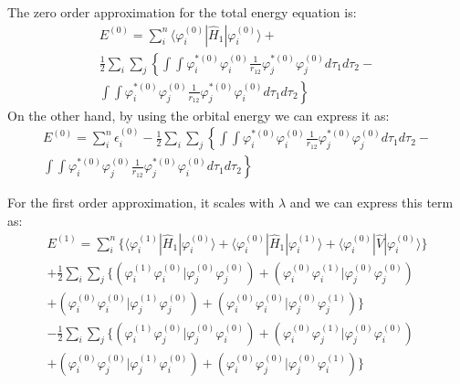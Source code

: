 The zero order approximation for the total energy equation is:
\begin{multline}\label{PTIMQMeq:11}
E^{(0)} =
\sum_{i}^{n}\langle\varphi^{(0)}_{i}|\hat{H}_{1}|\varphi^{(0)}_{i}\rangle
+
\\
\frac{1}{2}\sum_{i}\sum_{j} \left\{
\int\int\varphi^{*(0)}_{i}\varphi^{(0)}_{i}\frac{1}{r_{12}}
\varphi^{*(0)}_{j}\varphi^{(0)}_{j}d\tau_{1}d\tau_{2}- \right. \\
\left. \int\int\varphi^{*(0)}_{i}\varphi^{(0)}_{j}\frac{1}{r_{12}}
\varphi^{*(0)}_{j}\varphi^{(0)}_{i}d\tau_{1}d\tau_{2} \right\}
\end{multline}
On the other hand, by using the orbital energy we can express it as:
\begin{multline}\label{PTIMQMeq:12}
E^{(0)} = \sum_{i}^{n}\epsilon_{i}^{(0)} -
\frac{1}{2}\sum_{i}\sum_{j} \left\{
\int\int\varphi^{*(0)}_{i}\varphi^{(0)}_{i}\frac{1}{r_{12}}
\varphi^{*(0)}_{j}\varphi^{(0)}_{j}d\tau_{1}d\tau_{2}- \right. \\
\left. \int\int\varphi^{*(0)}_{i}\varphi^{(0)}_{j}\frac{1}{r_{12}}
\varphi^{*(0)}_{j}\varphi^{(0)}_{i}d\tau_{1}d\tau_{2} \right\}
\end{multline}

For the first order approximation, it scales with $\lambda$ and we
can express this term as:
\begin{multline}\label{PTIMQMeq:14}
E^{(1)} =\sum_{i}^{n}
\Bigg\{\langle\varphi^{(1)}_{i}|\hat{H}_{1}|\varphi^{(0)}_{i}\rangle
      +\langle\varphi^{(0)}_{i}|\hat{H}_{1}|\varphi^{(1)}_{i}\rangle +
       \langle\varphi^{(0)}_{i}|\hat{V}|\varphi^{(0)}_{i}\rangle\Bigg\}
\\
+\frac{1}{2}\sum_{i}\sum_{j}\Bigg\{
\left(\varphi^{(1)}_{i}\varphi^{(0)}_{i}|\varphi^{(0)}_{j}\varphi^{(0)}_{j}\right)
+
\left(\varphi^{(0)}_{i}\varphi^{(1)}_{i}|\varphi^{(0)}_{j}\varphi^{(0)}_{j}\right)
\\
+
\left(\varphi^{(0)}_{i}\varphi^{(0)}_{i}|\varphi^{(1)}_{j}\varphi^{(0)}_{j}\right)
+
\left(\varphi^{(0)}_{i}\varphi^{(0)}_{i}|\varphi^{(0)}_{j}\varphi^{(1)}_{j}\right)
\Bigg\} \\
-\frac{1}{2}\sum_{i}\sum_{j}\Bigg\{
\left(\varphi^{(1)}_{i}\varphi^{(0)}_{j}|\varphi^{(0)}_{j}\varphi^{(0)}_{i}\right)
+
\left(\varphi^{(0)}_{i}\varphi^{(1)}_{j}|\varphi^{(0)}_{j}\varphi^{(0)}_{i}\right)
\\
+
\left(\varphi^{(0)}_{i}\varphi^{(0)}_{j}|\varphi^{(1)}_{j}\varphi^{(0)}_{i}\right)
+
\left(\varphi^{(0)}_{i}\varphi^{(0)}_{j}|\varphi^{(0)}_{j}\varphi^{(1)}_{i}\right)
\Bigg\} \\
\end{multline}

